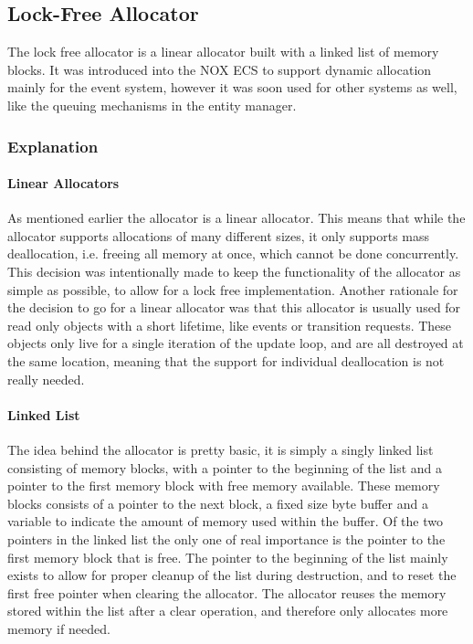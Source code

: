 \subsection{Lock-Free Allocator}
\label{subsec:detailed_lock_free_allocator}
The lock free allocator is a linear allocator built with a linked list of memory blocks.
It was introduced into the NOX ECS to support dynamic allocation mainly for the event system,
however it was soon used for other systems as well, like the queuing mechanisms in the entity manager.

\subsubsection{Explanation}
\paragraph{Linear Allocators}
As mentioned earlier the allocator is a linear allocator.
This means that while the allocator supports allocations of many different sizes,
it only supports mass deallocation, i.e. freeing all memory at once,
which cannot be done concurrently.
This decision was intentionally made to keep the functionality of the allocator as simple
as possible, to allow for a lock free implementation.
Another rationale for the decision to go for a linear allocator was that this allocator
is usually used for read only objects with a short lifetime, like events or transition requests.
These objects only live for a single iteration of the update loop, and are all destroyed at
the same location, meaning that the support for individual deallocation is not really needed.

\paragraph{Linked List}
The idea behind the allocator is pretty basic, it is simply a singly linked list consisting of
memory blocks, with a pointer to the beginning of the list and a pointer to the first memory block
with free memory available.
These memory blocks consists of a pointer to the next block, a fixed size byte buffer
and a variable to indicate the amount of memory used within the buffer.
Of the two pointers in the linked list the only one of real importance is the pointer to the first
memory block that is free. The pointer to the beginning of the list mainly exists to allow for proper
cleanup of the list during destruction, and to reset the first free pointer when clearing the allocator.
The allocator reuses the memory stored within the list after a clear operation, and therefore only
allocates more memory if needed.


